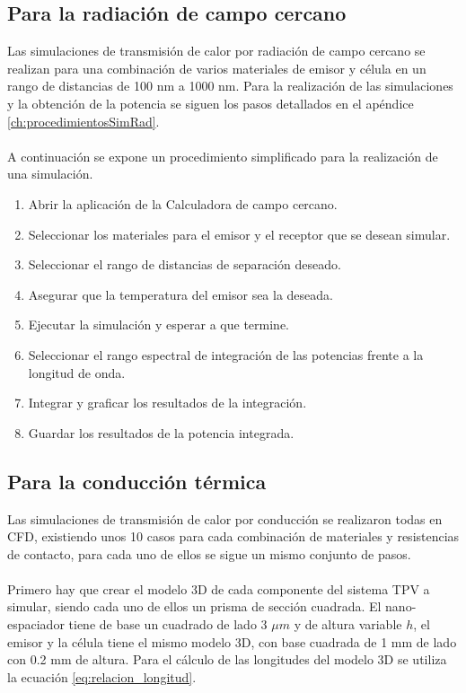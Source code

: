 \subsection{Para la radiación de campo cercano}
Las simulaciones de transmisión de calor por radiación de campo cercano se realizan para una combinación de varios materiales de emisor y célula en un rango de distancias de 100 nm a 1000 nm. Para la realización de las simulaciones y la obtención de la potencia se siguen los pasos detallados en el apéndice \ref{ch:procedimientosSimRad}.\\\\ A continuación se expone un procedimiento simplificado para la realización de una simulación.
\begin{enumerate}
	\item Abrir la aplicación de la Calculadora de campo cercano.
	\item Seleccionar los materiales para el emisor y el receptor que se desean simular. 
	\item Seleccionar el rango de distancias de separación deseado.
	\item Asegurar que la temperatura del emisor sea la deseada.
	\item Ejecutar la simulación y esperar a que termine.
	\item Seleccionar el rango espectral de integración de las potencias frente a la longitud de onda.
	\item Integrar y graficar los resultados de la integración.
	\item Guardar los resultados de la potencia integrada.
\end{enumerate}
\subsection{Para la conducción térmica}
Las simulaciones de transmisión de calor por conducción se realizaron todas en CFD, existiendo unos 10 casos para cada combinación de materiales y resistencias de contacto, para cada uno de ellos se sigue un mismo conjunto de pasos. \\\\
Primero hay que crear el modelo 3D de cada componente del sistema TPV a simular, siendo cada uno de ellos un prisma de sección cuadrada. El nano-espaciador tiene de base un cuadrado de lado 3 $\mu m$ y de altura variable $h$, el emisor y la célula tiene el mismo modelo 3D, con base cuadrada de 1 mm de lado con 0.2 mm de altura. Para el cálculo de las longitudes del modelo 3D se utiliza la ecuación \eqref{eq:relacion_longitud}.
